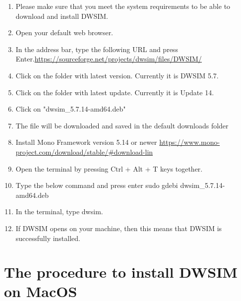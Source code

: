 \documentclass[12pt,a4paper]{article}
\begin{document}
\begin{enumerate}
\item Please make sure that you meet the system requirements to be able to download and install DWSIM.
\item Open your default web browser.
\item In the address bar, type the following URL and press Enter.\newline \url{https://sourceforge.net/projects/dwsim/files/DWSIM/}

\item Click on the folder with latest version. Currently it is DWSIM 5.7.

\item Click on the folder with latest update. Currently it is Update 14.
\item Click on "dwsim\_5.7.14-amd64.deb"
\item The file will be downloaded and saved in the default downloads folder
\item Install Mono Framework version 5.14 or newer
\newline \url{https://www.mono-project.com/download/stable/#download-lin}

\item Open the terminal by pressing Ctrl + Alt + T keys together.

\item Type the below command and press enter
\newline sudo gdebi dwsim\_5.7.14-amd64.deb

\item In the terminal, type dwsim.
\item If DWSIM opens on your machine, then this means that DWSIM is successfully installed.

\end{enumerate}

\section{The procedure to install DWSIM on MacOS}
\end{document}
